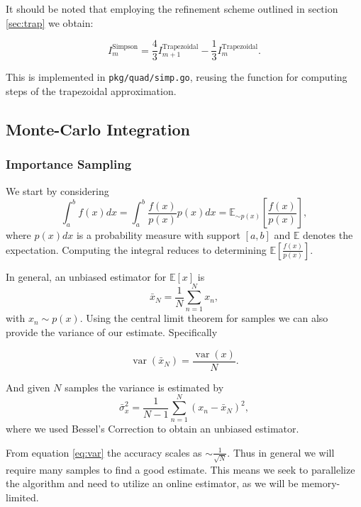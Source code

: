 \documentclass[10pt, a4paper]{article}
\begin{document}
  It should be noted that employing the refinement scheme outlined in section \ref{sec:trap} we
  obtain\cite{nr}:

  \begin{equation}
  I_m^{\text{Simpson}} = \frac{4}{3} I_{m+1}^{\text{Trapezoidal}} - \frac{1}{3} I_m^{\text{Trapezoidal}}.
  \end{equation}

  This is implemented in \texttt{pkg/quad/simp.go}, reusing the function for computing steps of the
  trapezoidal approximation.

\subsection{Monte-Carlo Integration}
  \subsubsection{Importance Sampling}
  We start by considering
  \begin{equation}
  \int_a^b f(x) dx = \int_{a}^{b} \frac{f(x)}{p(x)} p(x) dx = \mathbb{E}_{\sim p(x)}\left[ \frac{f(x)}{p(x)} \right],
  \end{equation}
  where $p(x)dx$ is a probability measure with support $[a, b]$ and $\mathbb{E}$ denotes the expectation.
  Computing the integral reduces to determining $\mathbb{E}\left[ \frac{f(x)}{p(x)} \right]$.

  In general, an unbiased estimator for $\mathbb{E}\left[ x \right]$ is
  \begin{equation}
  \bar{x}_N = \frac{1}{N} \sum_{n=1}^N x_n,
  \end{equation}
  with $x_n \sim p(x)$. Using the central limit theorem for \iid{} samples we can also provide the
  variance of our estimate. Specifically

  \begin{equation}
  \label{eq:var}
  \operatorname{var}(\bar{x}_N) = \frac{\operatorname{var}(x)}{N}.
  \end{equation}

  And given $N$ \iid{} samples the variance is estimated by
  \begin{equation}
  \bar{\sigma}_x^2 = \frac{1}{N-1} \sum_{n=1}^N (x_n - \bar{x}_N)^2,
  \end{equation}
  where we used Bessel's Correction\cite{nr} to obtain an unbiased estimator.

  From equation \ref{eq:var} the accuracy scales as $\sim \frac{1}{\sqrt{N}}$. Thus in general we will
  require many samples to find a good estimate. This means we seek to parallelize the algorithm and need
  to utilize an online estimator, as we will be memory-limited\footnotemark.
\end{document}
